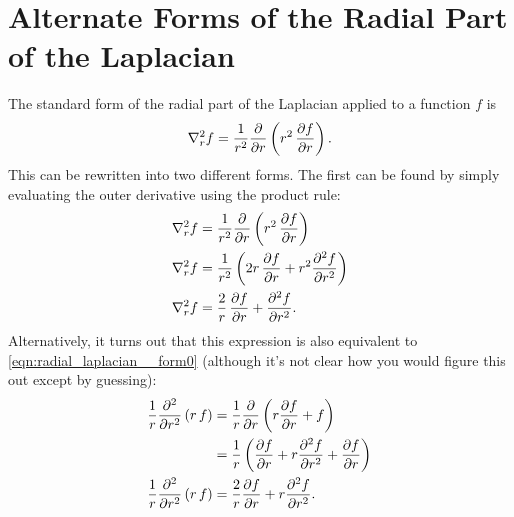 \documentclass[12pt]{article}
\numberwithin{equation}{section}
\begin{document}
\newpage
\section{Alternate Forms of the Radial Part of the Laplacian}\label{app:radial_laplacian}
The standard form of the radial part of the Laplacian applied to a function $f$ is
\begin{align}
\label{eqn:radial_laplacian__form0}
\laplacian_r{f}  = \frac{1}{r^2} \pdv{}{r} \left( r^2 \, \pdv{f}{r} \right).
\end{align}
This can be rewritten into two different forms. The first can be found by simply evaluating the outer derivative using the product rule:
\begin{align}
\label{eqn:radial_laplacian__form1}
\laplacian{}_r f &= \frac{1}{r^2} \pdv{}{r} \left( r^2 \, \pdv{f}{r} \right) \nonumber \\
\laplacian{}_r f &= \frac{1}{r^2} \left( 2r \, \pdv{f}{r} + r^2 \pdv[2]{f}{r} \right) \nonumber \\
\laplacian{}_r f &= \frac{2}{r} \, \pdv{f}{r} + \pdv[2]{f}{r}.
\end{align}
Alternatively, it turns out that this expression is also equivalent to \eqref{eqn:radial_laplacian__form0} (although it's not clear how you would figure this out except by guessing):
\begin{align*}
\frac{1}{r} \pdv[2]{}{r} \left( r \, f \right) &= \frac{1}{r} \pdv{}{r} \left(r \pdv{f}{r} + f\right) \\
&= \frac{1}{r} \left( \pdv{f}{r} + r \pdv[2]{f}{r} + \pdv{f}{r}  \right) \\
\frac{1}{r} \pdv[2]{}{r} \left( r \, f \right) &= \frac{2}{r} \pdv{f}{r} + r \pdv[2]{f}{r}.
\end{align*}



\newpage


\end{document}
